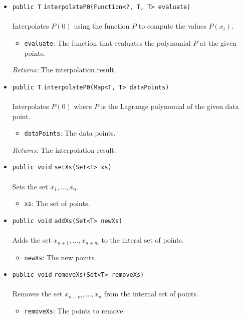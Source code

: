 \begin{itemize}
\item \lstinline|public T| \lstinline|interpolateP0|\lstinline|(Function<?, T, T> evaluate)|\\ \\[-0.6em]
Interpolates $P(0)$ using the function $P$ to compute the values
 $P(x_i)$.
\begin{itemize}
\item \lstinline|evaluate|: The function that evaluates the polynomial $P$ at the
 given points.
\end{itemize}

\emph{Returns:} The interpolation result.

\item \lstinline|public T| \lstinline|interpolateP0|\lstinline|(Map<T, T> dataPoints)|\\ \\[-0.6em]
Interpolates $P(0)$ where $P$ is the Lagrange polynomial of
 the given data point.
\begin{itemize}
\item \lstinline|dataPoints|: The data points.
\end{itemize}

\emph{Returns:} The interpolation result.

\item \lstinline|public void| \lstinline|setXs|\lstinline|(Set<T> xs)|\\ \\[-0.6em]
Sets the set ${x_1, ..., x_n}$.
\begin{itemize}
\item \lstinline|xs|: The set of points.
\end{itemize}



\item \lstinline|public void| \lstinline|addXs|\lstinline|(Set<T> newXs)|\\ \\[-0.6em]
Adds the set ${x_{n+1}, ..., x_{n+m}}$ to the interal set of points.
\begin{itemize}
\item \lstinline|newXs|: The new points.
\end{itemize}



\item \lstinline|public void| \lstinline|removeXs|\lstinline|(Set<T> removeXs)|\\ \\[-0.6em]
Removes the set ${x_{n-m}, ..., x_n}$ from the internal set of points.
\begin{itemize}
\item \lstinline|removeXs|: The points to remove
\end{itemize}




\end{itemize}

